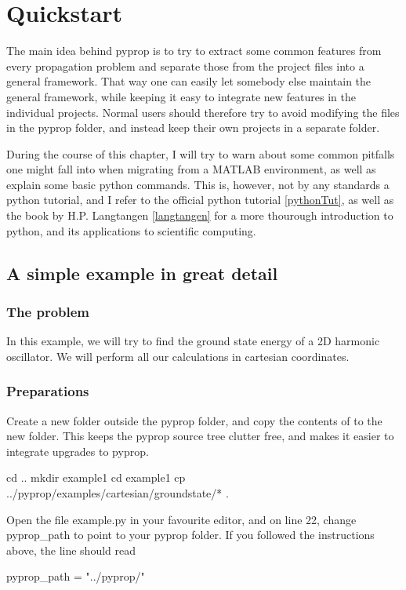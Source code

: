 \chapter{Quickstart}
The main idea behind pyprop is to try to extract some common features from every propagation problem and 
separate those from the project files into a general framework. 
That way one can easily let somebody else maintain the general framework, while keeping it easy to
integrate new features in the individual projects. Normal users should therefore try to avoid
modifying the files in the pyprop folder, and instead keep their own projects in a separate folder. 

During the course of this chapter, I will try to warn about some common pitfalls one might fall into
when migrating from a MATLAB environment, as well as explain some basic python commands. This is, however, 
not by any standards a python tutorial, and I refer to the official python tutorial \ref{pythonTut},
as well as the book by H.P. Langtangen \ref{langtangen} for a more thourough introduction to python, and
its applications to scientific computing.

\section{A simple example in great detail}
\subsection{The problem}
In this example, we will try to find the ground state energy of a 2D harmonic oscillator.
We will perform all our calculations in cartesian coordinates.

\subsection{Preparations}
Create a new folder outside the pyprop folder, and copy the contents of  to
the new folder. This keeps the pyprop source tree clutter free, and makes it easier to integrate upgrades to pyprop.
\begin{bash}
	cd ..
	mkdir example1
	cd example1
	cp ../pyprop/examples/cartesian/groundstate/* .
\end{bash}
Open the file example.py in your favourite editor, and on line 22, change pyprop\_path to point to your pyprop folder.
If you followed the instructions above, the line should read
\begin{bash}
	pyprop_path = "../pyprop/"
\end{bash}


